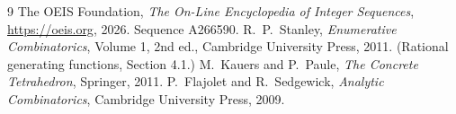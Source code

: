\documentclass[11pt,a4paper]{article}
\theoremstyle{plain}
\theoremstyle{definition}
\begin{document}
\begin{thebibliography}{9}
 The OEIS Foundation, \emph{The On-Line Encyclopedia of Integer
Sequences}, \url{https://oeis.org}, 2026. Sequence A266590.
 R.~P.~Stanley, \emph{Enumerative Combinatorics}, Volume 1, 2nd ed.,
Cambridge University Press, 2011. (Rational generating functions, Section 4.1.)
 M.~Kauers and P.~Paule, \emph{The Concrete Tetrahedron}, Springer, 2011.
 P.~Flajolet and R.~Sedgewick, \emph{Analytic Combinatorics}, Cambridge
University Press, 2009.
\end{thebibliography}
\end{document}
